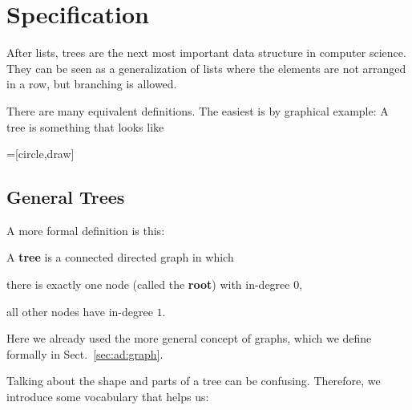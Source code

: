 \section{Specification}

After lists, trees are the next most important data structure in computer science.
They can be seen as a generalization of lists where the elements are not arranged in a row, but branching is allowed.

There are many equivalent definitions.
The easiest is by graphical example: A tree is something that looks like

=[circle,draw]
\begin{center}
\end{center}

\subsection{General Trees}

A more formal definition is this:

\begin{definition}[Tree]\label{def:ad:tree}
A \textbf{tree} is a connected directed graph in which
\begin{compactitem}
 \item there is exactly one node (called the \textbf{root}) with in-degree $0$,
 \item all other nodes have in-degree $1$.
\end{compactitem}
\end{definition}
Here we already used the more general concept of graphs, which we define formally in Sect.~\ref{sec:ad:graph}.

Talking about the shape and parts of a tree can be confusing.
Therefore, we introduce some vocabulary that helps us:

